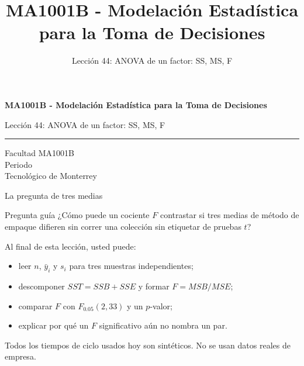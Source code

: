 \documentclass[aspectratio=169,10pt,spanish]{beamer}
\title{MA1001B - Modelación Estadística para la Toma de Decisiones}
\subtitle{Lección 44: ANOVA de un factor: SS, MS, F}
\author{}
\institute{Tecnol\'ogico de Monterrey}
\date{}
\begin{document}
\begin{frame}[plain]
  \vspace{1.2cm}
  {\Large\bfseries MA1001B - Modelación Estadística para la Toma de Decisiones\par}
  \vspace{0.7cm}
  {\large Lección 44: ANOVA de un factor: SS, MS, F\par}
  \vspace{0.7cm}
  {\color{TecRojo}\rule{\textwidth}{1.2pt}}
  \vspace{0.8cm}

  Facultad MA1001B\\[0.3cm]
  Periodo\\[0.3cm]
  Tecnol\'ogico de Monterrey
\end{frame}

\begin{frame}{La pregunta de tres medias}
  \begin{alertblock}{Pregunta guía}
    ¿Cómo puede un cociente $F$ contrastar si tres medias de método de
    empaque difieren sin correr una colección sin etiquetar de pruebas $t$?
  \end{alertblock}

  \vspace{0.6em}
  Al final de esta lección, usted puede:
  \begin{itemize}
    \item leer $n$, $\bar y_i$ y $s_i$ para tres muestras independientes;
    \item descomponer $SST=SSB+SSE$ y formar $F=MSB/MSE$;
    \item comparar $F$ con $F_{0.05}(2,33)$ y un $p$-valor;
    \item explicar por qué un $F$ significativo aún no nombra un par.
  \end{itemize}

  \vfill
  \scriptsize Todos los tiempos de ciclo usados hoy son sintéticos. No se usan datos reales de empresa.
\end{frame}
\end{document}
